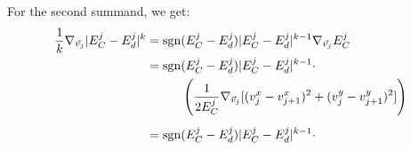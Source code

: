 \begin{proposition}
	For the second summand, we get:
	\begin{align*}
		\frac{1}{k} \nabla_{\vec{v}_{j}} |E^{j}_{C} - E^{j}_d|^k 
		&= \sgn(E^{j}_C - E^{j}_d) |E^{j}_C - E^{j}_d|^{k-1} \nabla_{\vec{v}_j} E^{j}_C \\
		&= \sgn(E^{j}_C - E^{j}_d) |E^{j}_C - E^{j}_d|^{k-1} \cdot   \\
		& \hspace{1cm} \left(\frac{1}{2 E^{j}_C} \nabla_{\vec{v}_j} [(v_{j}^{x} - v_{j+1}^{x})^2 + (v_{j}^{y} - v_{j+1}^{y})^2]\right) \\[0.5em] 
		&= \sgn(E^{j}_C - E^{j}_d) |E^{j}_C - E^{j}_d|^{k-1} \cdot   \\

\end{align*}
\end{proposition}
